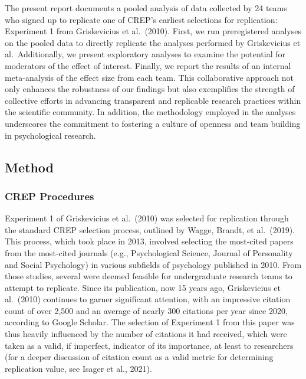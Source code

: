 \documentclass[
]{article}
\begin{document}
The present report documents a pooled analysis of data collected by 24
teams who signed up to replicate one of CREP's earliest selections for
replication: Experiment 1 from Griskevicius et al.~(2010). First, we run
preregistered analyses on the pooled data to directly replicate the
analyses performed by Griskevicius et al.~Additionally, we present
exploratory analyses to examine the potential for moderators of the
effect of interest. Finally, we report the results of an internal
meta-analysis of the effect size from each team. This collaborative
approach not only enhances the robustness of our findings but also
exemplifies the strength of collective efforts in advancing transparent
and replicable research practices within the scientific community. In
addition, the methodology employed in the analyses underscores the
commitment to fostering a culture of openness and team building in
psychological research.

\subsection{Method}\label{method}

\subsubsection{CREP Procedures}\label{crep-procedures}

Experiment 1 of Griskevicius et al.~(2010) was selected for replication
through the standard CREP selection process, outlined by Wagge, Brandt,
et al.~(2019). This process, which took place in 2013, involved
selecting the most-cited papers from the most-cited journals (e.g.,
Psychological Science, Journal of Personality and Social Psychology) in
various subfields of psychology published in 2010. From those studies,
several were deemed feasible for undergraduate research teams to attempt
to replicate. Since its publication, now 15 years ago, Griskevicius et
al.~(2010) continues to garner significant attention, with an impressive
citation count of over 2,500 and an average of nearly 300 citations per
year since 2020, according to Google Scholar. The selection of
Experiment 1 from this paper was thus heavily influenced by the number
of citations it had received, which were taken as a valid, if imperfect,
indicator of its importance, at least to researchers (for a deeper
discussion of citation count as a valid metric for determining
replication value, see Isager et al., 2021).
\end{document}
